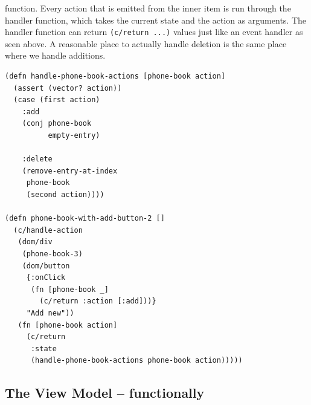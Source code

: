 \documentclass[sigplan,screen]{acmart}
\begin{document}
function. Every action that is emitted from the inner item is run
through the handler function, which takes the current state and the
action as arguments. The handler function can return
\texttt{(c/return ...)} values just like an event handler as seen
above. A reasonable place to actually handle deletion is the same
place where we handle additions.
%
\begin{verbatim}
(defn handle-phone-book-actions [phone-book action]
  (assert (vector? action))
  (case (first action)
    :add
    (conj phone-book
          empty-entry)

    :delete
    (remove-entry-at-index
     phone-book
     (second action))))

(defn phone-book-with-add-button-2 []
  (c/handle-action
   (dom/div
    (phone-book-3)
    (dom/button
     {:onClick
      (fn [phone-book _]
        (c/return :action [:add]))}
     "Add new"))
   (fn [phone-book action]
     (c/return
      :state
      (handle-phone-book-actions phone-book action)))))
\end{verbatim}
%






\subsection{The View Model -- functionally}




\end{document}
